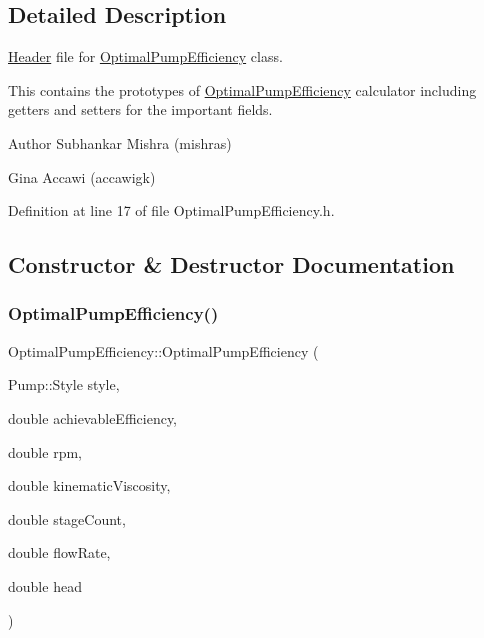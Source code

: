 \subsection{Detailed Description}
\hyperlink{class_header}{Header} file for \hyperlink{class_optimal_pump_efficiency}{Optimal\+Pump\+Efficiency} class. 

This contains the prototypes of \hyperlink{class_optimal_pump_efficiency}{Optimal\+Pump\+Efficiency} calculator including getters and setters for the important fields.

\begin{DoxyAuthor}{Author}
Subhankar Mishra (mishras) 

Gina Accawi (accawigk) 
\end{DoxyAuthor}


Definition at line 17 of file Optimal\+Pump\+Efficiency.\+h.



\subsection{Constructor \& Destructor Documentation}
\mbox{\label{class_optimal_pump_efficiency_ae07626ea079ff810ac6518d54c52b24a}} 
\subsubsection{\texorpdfstring{Optimal\+Pump\+Efficiency()}{OptimalPumpEfficiency()}}
{\footnotesize\ttfamily Optimal\+Pump\+Efficiency\+::\+Optimal\+Pump\+Efficiency (\begin{DoxyParamCaption}\item[{Pump\+::\+Style}]{style,  }\item[{double}]{achievable\+Efficiency,  }\item[{double}]{rpm,  }\item[{double}]{kinematic\+Viscosity,  }\item[{double}]{stage\+Count,  }\item[{double}]{flow\+Rate,  }\item[{double}]{head }\end{DoxyParamCaption})\hspace{0.3cm}{\ttfamily [inline]}}

